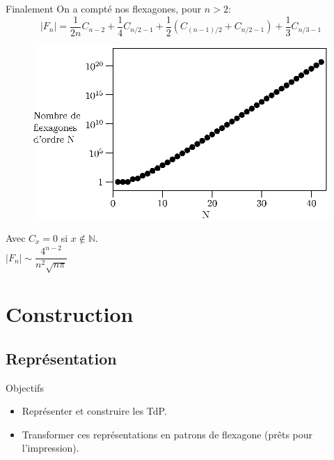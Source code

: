 \documentclass[french,xcolor=dvipsnames]{beamer}
\begin{document}
		\begin{frame}{Finalement}
		On a compté nos flexagones, pour $n>2$:
		{\large
		\[
			|F_{n}| = \frac{1}{2n}C_{n-2} + \frac{1}{4}C_{n/2-1} + \frac{1}{2}(C_{(n-1)/2}+C_{n/2-1}) + \frac{1}{3}C_{n/3-1}
		\]
		}
		\begin{figure}
			\includegraphics[scale=0.6]{nombre_flexagones.eps}
		\end{figure}
		\begin{flushleft}
			Avec $C_{x} = 0$ si $x \not\in \mathbb{N}$.\\
		$|F_{n}| \sim \dfrac{4^{n-2}}{n^{2}\sqrt{n\pi}}$
		\end{flushleft}
	\end{frame}
		



	\section{Construction}
		\subsection{Représentation}
		
		\begin{frame}{Objectifs}
			\begin{itemize}
					\item Représenter et construire les TdP.
					\item Transformer ces représentations en patrons de flexagone (prêts pour l'impression).
			\end{itemize}		
		\end{frame}
\end{document}
